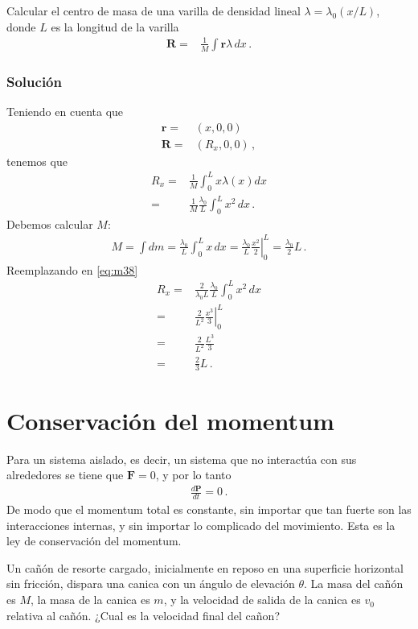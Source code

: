 Calcular el centro de masa de una varilla de densidad lineal $\lambda=\lambda_0(x/L)$, donde $L$ es la longitud de la varilla
  \begin{align}
    \mathbf{R}=&\frac{1}{M}\int \mathbf{r}\lambda\,dx\,.
  \end{align}
\subsubsection*{Solución}
Teniendo en cuenta que
\begin{align}
  \mathbf{r}=&(x,0,0)\nonumber\\
  \mathbf{R}=&(R_x,0,0)\,,
\end{align}
tenemos que
\begin{align}
  \label{eq:m38}
  R_x=&\frac{1}{M}\int_0^L x\lambda(x)dx\nonumber\\
  =&\frac{1}{M}\frac{\lambda_0}{L}\int_0^L x^2\,dx\,.
\end{align}
Debemos calcular $M$:
\begin{align}
  M=\int dm=\frac{\lambda_0}{L}\int_0^L x\,dx=\frac{\lambda_0}{L}
  \left.\frac{x^2}{2}  \right|_0^L=\frac{\lambda_0}{2}L\,.
\end{align}
Reemplazando en \eqref{eq:m38}
\begin{align}
  R_x=&\frac{2}{\lambda_0L}\frac{\lambda_0}{L}\int_0^L x^2\,dx\nonumber\\
  =&\frac{2}{L^2}\left.\frac{x^3}{3}  \right|_0^L\nonumber\\
  =&\frac{2}{L^2}\frac{L^3}{3}\nonumber\\
  =&\frac{2}{3}L\,.
\end{align}
\finejemplo

\section{Conservación del momentum}
Para un sistema aislado, es decir, un sistema que no interactúa con sus alrededores se tiene que $\mathbf{F}=0$, y por lo tanto
\begin{align}
  \frac{d\mathbf{P}}{dt}=0\,.
\end{align}
De modo que el momentum total es constante, sin importar que tan fuerte son las interacciones internas, y sin importar lo complicado del movimiento. Esta es la ley de conservación del momentum.

Un cañón de resorte cargado, inicialmente en reposo en una superficie horizontal sin fricción, dispara una canica con un ángulo de elevación $\theta$. La masa del cañón es $M$, la masa de la canica es $m$, y la velocidad de salida de la canica es $v_0$ relativa al cañón. ¿Cual es la velocidad final del cañon?

